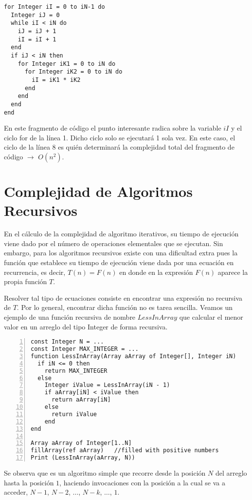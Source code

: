 \begin{lstlisting}[upquote=true, language=pseudo]
for Integer iI = 0 to iN-1 do
  Integer iJ = 0
  while iI < iN do
    iJ = iJ + 1
    iI = iI + 1
  end
  if iJ < iN then
    for Integer iK1 = 0 to iN do
      for Integer iK2 = 0 to iN do
        iI = iK1 * iK2
      end
    end
  end  
end
\end{lstlisting}

En este fragmento de código el punto interesante radica sobre la variable $iI$ y el ciclo for de la línea 1. Dicho ciclo solo se ejecutará 1 sola vez. En este caso, el ciclo de la línea 8 es quién determinará la complejidad total del fragmento de código $\rightarrow$ $O(n^{2})$.

\section{Complejidad de Algoritmos Recursivos}

En el cálculo de la complejidad de algoritmo iterativos, su tiempo de ejecución viene dado por el número de operaciones elementales que se ejecutan. Sin embargo, para los algoritmos recursivos existe con una dificultad extra pues la función que establece su tiempo de ejecución viene dada por una ecuación en recurrencia, es decir, $T(n) = F(n)$ en donde en la expresión $F(n)$ aparece la propia función $T$.

Resolver tal tipo de ecuaciones consiste en encontrar una expresión no recursiva de $T$. Por lo general, encontrar dicha función no es tarea sencilla. Veamos un ejemplo de una función recursiva de nombre $LessInArray$ que calcular el menor valor en un arreglo del tipo Integer de forma recursiva.

\begin{lstlisting}[upquote=true, language=pseudo, numbers=left]
const Integer N = ...
const Integer MAX_INTEGER = ...
function LessInArray(Array aArray of Integer[], Integer iN)
  if iN <= 0 then
    return MAX_INTEGER
  else
    Integer iValue = LessInArray(iN - 1)
    if aArray[iN] < iValue then
      return aArray[iN]
    else
      return iValue
    end
end

Array aArray of Integer[1..N]
fillArray(ref aArray)	//filled with positive numbers
Print (LessInArray(aArray, N))
\end{lstlisting}

Se observa que es un algoritmo simple que recorre desde la posición $N$ del arreglo hasta la posición $1$, haciendo invocaciones con la posición a la cual se va a acceder, $N-1$, $N-2$, $\dots$, $N-k$, $\dots$, $1$.

